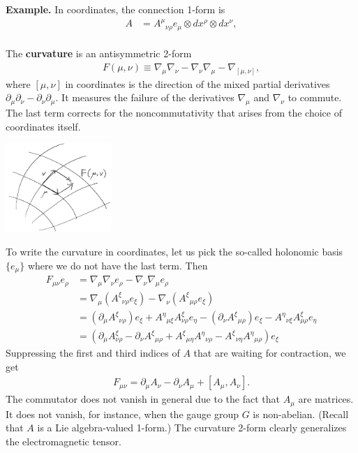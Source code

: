 \documentclass[aps,nofootinbib]{revtex4}
\begin{document}
{\bf Example.} In coordinates, the connection 1-form is
\begin{align}
A &=  A^{\mu}{}_{\nu \rho} e_{\mu} \otimes dx^{\rho} \otimes dx^{\nu},
\end{align} \\
The {\bf curvature} is an antisymmetric 2-form
\begin{align}
F(\mu ,\nu) \equiv \nabla_{\mu} \nabla_{\nu} - \nabla_{\nu} \nabla_{\mu} - \nabla_{[\mu ,\nu]},
\end{align}
where $[\mu ,\nu]$ in coordinates is the direction of the mixed partial derivatives $\partial_{\mu} \partial_{\nu} - \partial_{\nu} \partial_{\mu}$. It measures the failure of the derivatives $\nabla_{\mu}$ and $\nabla_{\nu}$ to commute. The last term corrects for the noncommutativity that arises from the choice of coordinates itself.
\begin{center}
\includegraphics[width=0.3\textwidth]{curvature.png}
\end{center}
To write the curvature in coordinates, let us pick the so-called holonomic basis $\{e_{\mu}\}$ where we do not have the last term. Then
\begin{align*}
F_{\mu \nu} e_{\rho} &= \nabla_{\mu} \nabla_{\nu} e_{\rho} - \nabla_{\nu} \nabla_{\mu} e_{\rho} \\
	&= \nabla_{\mu} ( A^{\xi}{}_{\nu \rho} e_{\xi}) - \nabla_{\nu} (A^{\xi}{}_{\mu \rho} e_{\xi}) \\
    &= (\partial_{\mu} A^{\xi}{}_{\nu \rho}) e_{\xi} + A^{\eta}{}_{\mu \xi} A^{\xi}_{\nu \rho} e_{\eta} - 
    (\partial_{\nu} A^{\xi}{}_{\mu \rho}) e_{\xi} - A^{\eta}{}_{\nu \xi} A^{\xi}_{\mu \rho} e_{\eta} \\
    &= \left( \partial_{\mu} A^{\xi}_{\nu \rho} - \partial_{\nu} A^{\xi}{}_{\mu \rho} + A^{\xi}{}_{\mu \eta} A^{\eta}{}_{\nu \rho} - A^{\xi}{}_{\nu \eta} A^{\eta}{}_{\mu \rho} \right) e_{\xi}
\end{align*}
Suppressing the first and third indices of $A$ that are waiting for contraction, we get
\begin{align}
\boxed{F_{\mu \nu} = \partial_{\mu} A_{\nu} - \partial_{\nu} A_{\mu} + [A_{\mu},A_{\nu}]}.
\end{align}
The commutator does not vanish in general due to the fact that $A_{\mu}$ are matrices. It does not vanish, for instance, when the gauge group $G$ is non-abelian. (Recall that $A$ is a Lie algebra-valued 1-form.) The curvature 2-form clearly generalizes the electromagnetic tensor.
\end{document}
